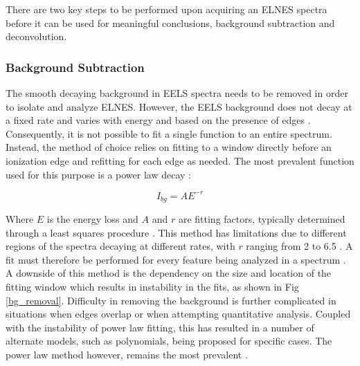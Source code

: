 There are two key steps to be performed upon acquiring an ELNES spectra before it can be used for meaningful conclusions, background subtraction and deconvolution. 





\subsubsection{Background Subtraction} \label{bg_section}
The smooth decaying background in EELS spectra needs to be removed in order to isolate and analyze ELNES.  However, the EELS background does not decay at a fixed rate and varies with energy and based on the presence of edges \cite{new_bg}. Consequently, it is not possible to fit a single function to an entire spectrum.  Instead, the method of choice relies on fitting to a window directly before an ionization edge and refitting for each edge as needed.  The most prevalent function used for this purpose is a power law decay \cite{Egerton}: 

\begin{equation}
	I_{bg} = AE^{-r}
\end{equation}


Where $E$ is the energy loss and $A$ and $r$ are fitting factors, typically determined through a least squares procedure \cite{reimer_transmission_2008}.  This method has limitations due to different regions of the spectra decaying at different rates, with $r$ ranging from 2 to 6.5 \cite{reimer_transmission_2008}. A fit must therefore be performed for every feature being analyzed in a spectrum \cite{verbeeck_model_2004, egerton_inelastic_1975}.  A downside of this method is the dependency on the size and location of the fitting window which results in instability in the fits, as shown in Fig \ref{bg_removal}.  Difficulty in removing the background is further complicated in situations when edges overlap or when attempting quantitative analysis.  Coupled with the instability of power law fitting, this has resulted in a number of alternate models, such as polynomials, being proposed for specific cases. The power law method however, remains the most prevalent \cite{verbeeck_model_2004, riedl_extraction_2006}.  

